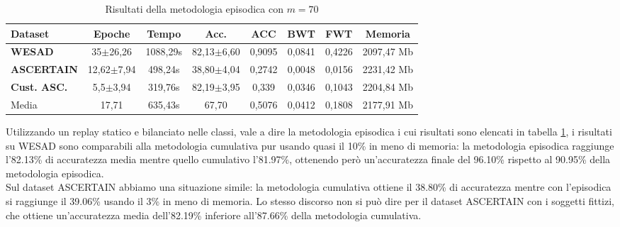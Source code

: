 \begin{table}[h]
\footnotesize
    \begin{tabular}{l|c|c|c|c|c|c|c}
        \textbf{Dataset} & \textbf{Epoche} & \textbf{Tempo} & \textbf{Acc.} & \textbf{ACC} & \textbf{BWT} & \textbf{FWT} & \textbf{Memoria}\\
        \hline
        \textbf{WESAD} & 35$\pm$26,26 & 1088,29s & 82,13$\pm$6,60 & 0,9095 & 0,0841 & 0,4226 & 2097,47 Mb\\
        \textbf{ASCERTAIN} & 12,62$\pm$7,94 & 498,24s & 38,80$\pm$4,04 & 0,2742 & 0,0048 & 0,0156 & 2231,42 Mb\\
        \textbf{Cust. ASC.} & 5,5$\pm$3,94 & 319,76s & 82,19$\pm$3,95 & 0,339 & 0,0346 & 0,1043 & 2204,84 Mb\\
        \hline
        Media & 17,71 & 635,43s & 67,70 & 0,5076 & 0,0412 & 0,1808 & 2177,91 Mb
    \end{tabular}
    \caption{Risultati della metodologia episodica con $m = 70$}
    \label{tab:resepisodic}
\end{table}
Utilizzando un replay statico e bilanciato nelle classi, vale a dire la metodologia episodica i cui risultati sono elencati in tabella \ref{tab:resepisodic}, i risultati su WESAD sono comparabili alla metodologia cumulativa pur usando quasi il 10\% in meno di memoria: la metodologia episodica raggiunge l'82.13\% di accuratezza media mentre quello cumulativo l'81.97\%, ottenendo però un'accuratezza finale del 96.10\% rispetto al 90.95\% della metodologia episodica.\\
Sul dataset ASCERTAIN abbiamo una situazione simile: la metodologia cumulativa ottiene il 38.80\% di accuratezza mentre con l'episodica si raggiunge il 39.06\% usando il 3\% in meno di memoria. Lo stesso discorso non si può dire per il dataset ASCERTAIN con i soggetti fittizi, che ottiene un'accuratezza media dell'82.19\% inferiore all'87.66\% della metodologia cumulativa.

